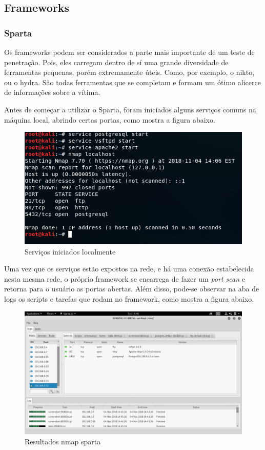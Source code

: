 \documentclass[journal]{IEEEtran}
\begin{document}
\subsection{Frameworks}
\subsubsection{Sparta}
Os frameworks podem ser considerados a parte mais importante de um teste de penetração. Pois, eles carregam dentro de sí uma grande diversidade de ferramentas pequenas, porém extremamente úteis. Como, por exemplo, o nikto, ou o hydra. São todas ferramentas que se completam e formam um ótimo alicerce de informações sobre a vítima. \par
Antes de começar a utilizar o Sparta, foram iniciados alguns serviços comuns na máquina local, abrindo certas portas, como mostra a figura abaixo.

\begin{figure}[h!]
	\includegraphics[width=\linewidth]{../nmap_localhost.png}
	\caption{Serviços iniciados localmente}
	\label{fig:local_services}
\end{figure}

Uma vez que os serviços estão expostos na rede, e há uma conexão estabelecida nesta mesma rede, o próprio framework se encarrega de fazer um \textit{port scan} e retorna para o usuário as portas abertas. Além disso, pode-se observar na aba de logs os scripts e tarefas que rodam no framework, como mostra a figura abaixo.
\par

\begin{figure}[h!]
	\includegraphics[width=\linewidth]{../servicos_sparta.png}
	\caption{Resultados nmap sparta}
	\label{fig:sparta_nmap_results}
\end{figure}
\end{document}
